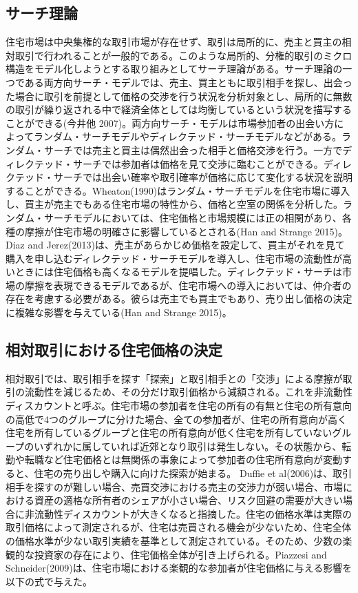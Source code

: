 \documentclass[a4paper,fontsize=11pt,report,notitlepage,line_length=38zw,number_of_lines=40,dvipdfmx]{jlreq}
\begin{document}
\subsection{サーチ理論}
住宅市場は中央集権的な取引市場が存在せず、取引は局所的に、売主と買主の相対取引で行われることが一般的である。このような局所的、分権的取引のミクロ構造をモデル化しようとする取り組みとしてサーチ理論がある。サーチ理論の一つである両方向サーチ・モデルでは、売主、買主ともに取引相手を探し、出会った場合に取引を前提として価格の交渉を行う状況を分析対象とし、局所的に無数の取引が繰り返される中で経済全体としては均衡しているという状況を描写することができる(今井他 2007)\cite{imai2007}。両方向サーチ・モデルは市場参加者の出会い方によってランダム・サーチモデルやディレクテッド・サーチモデルなどがある。ランダム・サーチでは売主と買主は偶然出会った相手と価格交渉を行う。一方でディレクテッド・サーチでは参加者は価格を見て交渉に臨むことができる。ディレクテッド・サーチでは出会い確率や取引確率が価格に応じて変化する状況を説明することができる。Wheaton(1990)\cite{wheaton1990}はランダム・サーチモデルを住宅市場に導入し、買主が売主でもある住宅市場の特性から、価格と空室の関係を分析した。ランダム・サーチモデルにおいては、住宅価格と市場規模には正の相関があり、各種の摩擦が住宅市場の明確さに影響しているとされる(Han and Strange 2015)\cite{han2015}。
Diaz and Jerez(2013)\cite{diaz2013}は、売主があらかじめ価格を設定して、買主がそれを見て購入を申し込むディレクテッド・サーチモデルを導入し、住宅市場の流動性が高いときには住宅価格も高くなるモデルを提唱した。ディレクテッド・サーチは市場の摩擦を表現できるモデルであるが、住宅市場への導入においては、仲介者の存在を考慮する必要がある。彼らは売主でも買主でもあり、売り出し価格の決定に複雑な影響を与えている(Han and Strange  2015)\cite{han2015}。

\subsection{相対取引における住宅価格の決定}
相対取引では、取引相手を探す「探索」と取引相手との「交渉」による摩擦が取引の流動性を減じるため、その分だけ取引価格から減額される。これを非流動性ディスカウントと呼ぶ。住宅市場の参加者を住宅の所有の有無と住宅の所有意向の高低で4つのグループに分けた場合、全ての参加者が、住宅の所有意向が高く住宅を所有しているグループと住宅の所有意向が低く住宅を所有していないグループのいずれかに属していれば近郊となり取引は発生しない。その状態から、転勤や転職など住宅価格とは無関係の事象によって参加者の住宅所有意向が変動すると、住宅の売り出しや購入に向けた探索が始まる。
Duffie et al(2006)\cite{duffie2007}は、取引相手を探すのが難しい場合、売買交渉における売主の交渉力が弱い場合、市場における資産の適格な所有者のシェアが小さい場合、リスク回避の需要が大きい場合に非流動性ディスカウントが大きくなると指摘した。住宅の価格水準は実際の取引価格によって測定されるが、住宅は売買される機会が少ないため、住宅全体の価格水準が少ない取引実績を基準として測定されている。そのため、少数の楽観的な投資家の存在により、住宅価格全体が引き上げられる。Piazzesi and Schneider(2009)\cite{piazzesi2009}は、住宅市場における楽観的な参加者が住宅価格に与える影響を以下の式で与えた。
\end{document}
